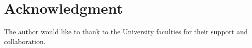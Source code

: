 \documentclass[10pt,conference]{IEEEtran}
\begin{document}
\section*{Acknowledgment}
The author would like to thank to the University faculties for their support and collaboration. 


%
%
%


\end{document}
